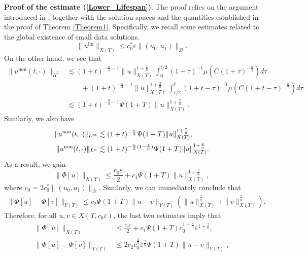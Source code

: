 \documentclass[11pt,reqno]{amsart}
\begin{document}
 \textbf{Proof of the estimate (\ref{Lower_Lifespan})}.
The proof relies on the argument introduced in \cite{Ikeda2016}, together with the solution spaces and the quantities established in the proof of Theorem \ref{Theorem1}. Specifically, we recall some estimates related to the global existence of small data solutions.
$$
\|u^{\text{lin}}\|_{X(T)} \leq c_{0}^*\varepsilon\|(u_0,u_1)\|_{\mathcal{D}}.
$$
On the other hand, we see that 
\begin{equation*}
\begin{aligned}
\|u^{\text{non}}(t,\cdot)\|_{\dot{H}^2}&\lesssim  (1+t)^{-\frac{n}{4}-1}\|u\|_{X(T)}^{1+\frac{2}{n}} \int_0^{t/2}(1+\tau)^{-1} \mu\left(C(1+\tau)^{-\frac{n}{2}}\right) d\tau\\
&\qquad + (1+t)^{-\frac{n}{4}-1}\|u\|_{X(T)}^{1+\frac{2}{n}} \int_{t/2}^t (1+t-\tau)^{-1} \mu\left(C(1+t-\tau)^{-\frac{n}{2}}\right) d\tau\\
&\lesssim (1+t)^{-\frac{n}{4}-1}\Psi(1+T)\|u\|^{1+\frac{2}{n}}_{X(T)}.
\end{aligned}
\end{equation*}
Similarly, we also have
\begin{equation*}
\begin{aligned}
\|u^{\rm non}(t,\cdot)\|_{L^\infty}&\lesssim (1+t)^{-\frac{n}{2}}\Psi(1+T)\|u\|_{X(T)}^{1+\frac{2}{n}},\\
\|u^{\rm non}(t,\cdot)\|_{L^\alpha}&\lesssim (1+t)^{-\frac{n}{2}(1-\frac{1}{\alpha})}\Psi(1+T)\|u\|_{X(T)}^{1+\frac{2}{n}}.
\end{aligned}
\end{equation*}
As a result, we gain
\begin{equation*}
\|\Phi[u]\|_{X(T)}\leq \frac{c_0 \varepsilon}{2} +c_1\Psi(1+T)\|u\|^{1+\frac{2}{n}}_{X(T)},
\end{equation*}
where $c_0= 2c_0^*\|(u_0,u_1)\|_{\mathcal{D}}$. 
Similarly, we can immediately conclude that
\begin{align*}
    \|\Phi[u]-\Phi[v]\|_{Y(T)} \leq c_2 \Psi(1+T) \|u-v\|_{Y(T)} \left(\|u\|_{X(T)}^{\frac{2}{n}} + \|v\|_{X(T)}^{\frac{2}{n}}\right).
\end{align*}
Therefore, for all $u, v \in X(T, c_0\varepsilon)$, the last two estimates imply that
\begin{align*}
    \|\Phi[u]\|_{X(T)}  &\leq \frac{c_0 \varepsilon}{2} + c_1 \Psi(1+T) c_0 ^{1+\frac{2}{n}}\varepsilon^{1+\frac{2}{n}},\\
    \|\Phi[u]-\Phi[v]\|_{Y(T)} &\leq 2 c_2c_0^{\frac{2}{n}} \varepsilon^{\frac{2}{n}}\Psi(1+T)  \|u-v\|_{Y(T)},
\end{align*}
\end{document}

